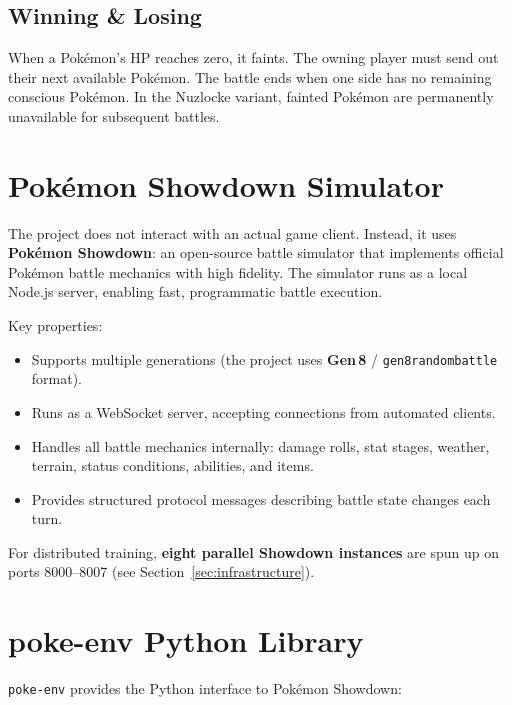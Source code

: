 
\subsection{Winning \& Losing}

When a Pok\'{e}mon's HP reaches zero, it faints.  The owning player must send
out their next available Pok\'{e}mon.  The battle ends when one side has no
remaining conscious Pok\'{e}mon.  In the Nuzlocke variant, fainted Pok\'{e}mon
are permanently unavailable for subsequent battles.

\section{Pok\'{e}mon Showdown Simulator}

The project does not interact with an actual game client.  Instead, it uses
\textbf{Pok\'{e}mon Showdown}: an open-source battle simulator that
implements official Pok\'{e}mon battle mechanics with high fidelity.  The
simulator runs as a local Node.js server, enabling fast, programmatic battle
execution.

Key properties:

\begin{itemize}
  \item Supports multiple generations (the project uses \textbf{Gen\,8} /
        \texttt{gen8randombattle} format).
  \item Runs as a WebSocket server, accepting connections from automated
        clients.
  \item Handles all battle mechanics internally: damage rolls, stat stages,
        weather, terrain, status conditions, abilities, and items.
  \item Provides structured protocol messages describing battle state changes
        each turn.
\end{itemize}

For distributed training, \textbf{eight parallel Showdown instances} are spun
up on ports 8000--8007 (see Section~\ref{sec:infrastructure}).

\section{poke-env Python Library}

\texttt{poke-env} provides the Python interface to Pok\'{e}mon Showdown:

